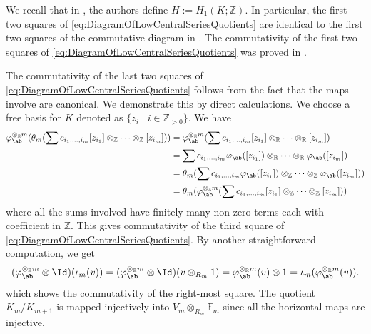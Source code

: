 \documentclass{amsart}
\makeatletter
\renewenvironment{proof}[1][\proofname]{%
   \par\pushQED{\qed}\normalfont%
   \topsep6\p@\@plus6\p@\relax
   \trivlist\item[\hskip\labelsep\bfseries#1\@addpunct{.}]%
   \ignorespaces
}{%
   \popQED\endtrivlist\@endpefalse
}
\makeatother
\begin{document}
 \begin{proof}
    We recall that in \cite{CaiClayRolfsen}, the authors define $H := H_1(K;\mathbb{Z})$. In particular, the first two squares of \cref{eq:DiagramOfLowCentralSeriesQuotients} are identical to the first two squares of the commutative diagram in \cite[Lemma 3.1]{CaiClayRolfsen}. The commutativity of the first two squares of \cref{eq:DiagramOfLowCentralSeriesQuotients} was proved in \cite[Lemma 3.1]{CaiClayRolfsen}. 

    The commutativity of the last two squares of \cref{eq:DiagramOfLowCentralSeriesQuotients} follows from the fact that the maps involve are canonical. We demonstrate this by direct calculations. We choose a free basis for $K$ denoted as $\{z_i \mid i \in \mathbb{Z}_{>0}\}$. We have
    \begin{align*}
        \varphi_{\ab}^{\otimes_{\mathbb{R}} m}(\theta_m(\sum c_{i_1,\dots,i_m}[z_{i_1}] \otimes_{\mathbb{Z}} \dots \otimes_{\mathbb{Z}}  [z_{i_m}])) 
        &= \varphi_{\ab}^{\otimes_{\mathbb{R}} m}(\sum c_{i_1,\dots,i_m}[z_{i_1}] \otimes_{\mathbb{R}} \dots \otimes_{\mathbb{R}}  [z_{i_m}]) \\
        &= \sum c_{i_1,\dots,i_m}\varphi_{\ab}([z_{i_1}]) \otimes_{\mathbb{R}} \dots \otimes_{\mathbb{R}}  \varphi_{\ab}([z_{i_m}]) \\
        &= \theta_m(\sum c_{i_1,\dots,i_m}\varphi_{\ab}([z_{i_1}]) \otimes_{\mathbb{Z}} \dots \otimes_{\mathbb{Z}}  \varphi_{\ab}([z_{i_m}])) \\
        &= \theta_m(\varphi_{\ab}^{\otimes_{\mathbb{Z}}m}(\sum c_{i_1,\dots,i_m}[z_{i_1}] \otimes_{\mathbb{Z}} \dots \otimes_{\mathbb{Z}}  [z_{i_m}])) \\
    \end{align*}
    where all the sums involved have finitely many non-zero terms each with coefficient in $\mathbb{Z}$. This gives commutativity of the third square of \cref{eq:DiagramOfLowCentralSeriesQuotients}. By another straightforward computation, we get
    \[
    (\varphi_{\ab}^{\otimes_{\mathbb{R}} m} \otimes \Id)(\iota_m(v)) = (\varphi_{\ab}^{\otimes_{\mathbb{R}} m} \otimes \Id)(v \otimes_{R_m} 1) = \varphi_{\ab}^{\otimes_{\mathbb{R}} m} (v) \otimes 1 = \iota_m (\varphi_{\ab}^{\otimes_{\mathbb{R}} m}(v)).
    \]
    which shows the commutativity of the right-most square. The quotient $K_m/K_{m+1}$ is mapped injectively into $V_m \otimes_{R_m} \mathbb{F}_m$ since all the horizontal maps are injective. 
 \end{proof}
\end{document}

